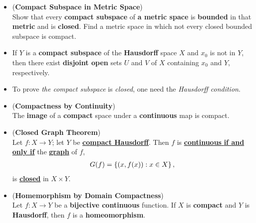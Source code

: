 \documentclass[11pt]{article}
\begin{document}
\begin{itemize}
\item \begin{exercise}(\textbf{Compact Subspace in Metric Space})\\
Show that every \textbf{compact subspace} of \textbf{a metric space} is \textbf{bounded} in that \textbf{metric} and is \textbf{closed}. Find a metric space in which not every closed bounded subspace is compact.
\end{exercise}


\item \begin{proposition} 
If $Y$ is a \textbf{compact subspace} of the \textbf{Hausdorff} space $X$ and $x_0$ is not in $Y$, then there exist \textbf{disjoint open} sets $U$ and $V$ of $X$ containing $x_0$ and $Y$, respectively.
\end{proposition}

\item \begin{remark}
To prove \emph{the compact subspace} is \emph{closed}, one need the \emph{Hausdorff condition}.
\end{remark}

\item \begin{proposition} (\textbf{Compactness by Continuity}) \citep{munkres2000topology} \\
The \textbf{image} of a \textbf{compact} space under a \textbf{continuous} map is compact.
\end{proposition}


\item \begin{theorem} (\textbf{Closed Graph Theorem}) \citep{reed1980methods, munkres2000topology}\\
Let $f : X \rightarrow Y$; let $Y$ be \underline{\textbf{compact Hausdorff}}. Then $f$ is \underline{\textbf{continuous} \textbf{if and only if}} the \underline{\textbf{graph}} of $f$,
\begin{align*}
G(f) = \left\{(x, f(x)):  x\in X\right\},
\end{align*}
is \underline{\textbf{closed}} in $X \times Y$. 
\end{theorem} 

\item \begin{theorem} (\textbf{Homemorphism by Domain Compactness})\citep{munkres2000topology}\\
Let $f : X \rightarrow Y$ be a \textbf{bijective continuous} function. If $X$ is \textbf{compact} and $Y$ is \textbf{Hausdorff}, then $f$ is a \textbf{homeomorphism}.
\end{theorem}


\end{itemize}
\end{document}
